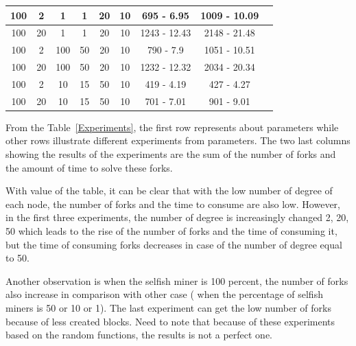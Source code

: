 \documentclass[runningheads,a4paper]{llncs}
\begin{document}
\begin{table}[!htbp]
\begin{tabular}{c c c c c c c c c}
100 &  2 &  1 &  1 &  20 &  10 &  695 - 6.95 &  1009 - 10.09  \\ \hline
100 &  20 &  1 &  1 &  20 &  10 &  1243 - 12.43 &  2148 - 21.48  \\ \hline

100 &  2 &  100 &  50 &  20 &  10 &  790 - 7.9 &  1051 - 10.51  \\ \hline
100 &  20 &  100 &  50 &  20 &  10 &  1232 - 12.32 &  2034 - 20.34  \\ \hline

100 &  2 &  10 &  15 &  50 &  10 &  419 - 4.19 &  427 - 4.27  \\ \hline
100 &  20 &  10 &  15 &  50 &  10 &  701 - 7.01 &  901 - 9.01  \\ \hline

\hline
\hline
\end{tabular}
\end{table}


From the Table~\ref{Experiments}, the first row represents about parameters while other rows illustrate different experiments from parameters.
The two last columns showing the results of the experiments are the sum of the number of forks and the amount of time to solve these forks.

With value of the table, it can be clear that with the low number of degree of each node, the number of forks and the time to consume are also low.
However, in the first three experiments, the number of degree is increasingly changed 2, 20, 50 which leads to the rise of the number of forks and the time of consuming it, but the time of consuming forks decreases in case of the number of degree equal to 50.

Another observation is when the selfish miner is 100 percent, the number of forks also increase in comparison with other case ( when the percentage of selfish miners is 50 or 10 or 1).
The last experiment can get the low number of forks because of less created blocks.
Need to note that because of these experiments based on the random functions, the results is not a perfect one.
\end{document}
